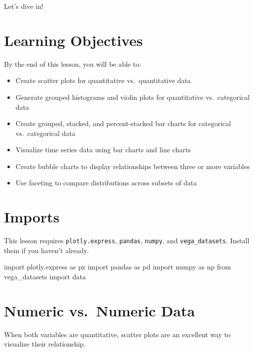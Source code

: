 \documentclass[
  letterpaper,
  DIV=11,
  numbers=noendperiod]{scrreprt}
\newenvironment{Shaded}{\begin{snugshade}}{\end{snugshade}}
\newcommand{\ImportTok}[1]{\textcolor[rgb]{0.00,0.46,0.62}{#1}}
\newcommand{\NormalTok}[1]{\textcolor[rgb]{0.00,0.23,0.31}{#1}}
\providecommand{\tightlist}{%
  \setlength{\itemsep}{0pt}\setlength{\parskip}{0pt}}\usepackage{longtable,booktabs,array}
\begin{document}
Let's dive in!

\section{Learning Objectives}\label{learning-objectives-6}

By the end of this lesson, you will be able to:

\begin{itemize}
\tightlist
\item
  Create scatter plots for quantitative vs.~quantitative data
\item
  Generate grouped histograms and violin plots for quantitative
  vs.~categorical data
\item
  Create grouped, stacked, and percent-stacked bar charts for
  categorical vs.~categorical data
\item
  Visualize time series data using bar charts and line charts
\item
  Create bubble charts to display relationships between three or more
  variables
\item
  Use faceting to compare distributions across subsets of data
\end{itemize}

\section{Imports}\label{imports-2}

This lesson requires \texttt{plotly.express}, \texttt{pandas},
\texttt{numpy}, and \texttt{vega\_datasets}. Install them if you haven't
already.

\begin{Shaded}
\begin{Highlighting}[]
\ImportTok{import}\NormalTok{ plotly.express }\ImportTok{as}\NormalTok{ px}
\ImportTok{import}\NormalTok{ pandas }\ImportTok{as}\NormalTok{ pd}
\ImportTok{import}\NormalTok{ numpy }\ImportTok{as}\NormalTok{ np}
\ImportTok{from}\NormalTok{ vega\_datasets }\ImportTok{import}\NormalTok{ data}
\end{Highlighting}
\end{Shaded}

\section{Numeric vs.~Numeric Data}\label{numeric-vs.-numeric-data}

When both variables are quantitative, scatter plots are an excellent way
to visualize their relationship.
\end{document}
